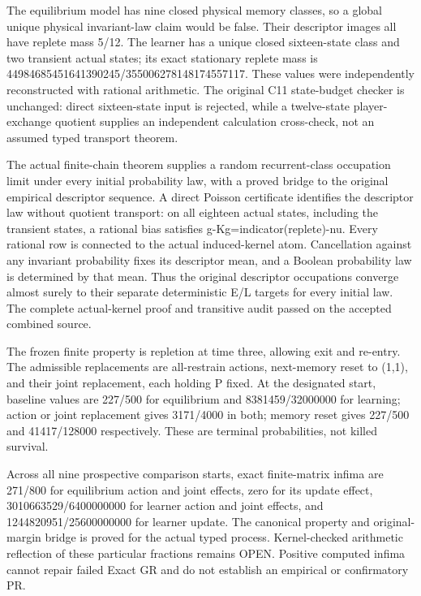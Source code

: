 \documentclass[11pt,a4paper]{article}
\begin{document}
The equilibrium model has nine closed physical memory classes, so a global unique physical invariant-law claim would be false. Their descriptor images all have replete mass 5/12. The learner has a unique closed sixteen-state class and two transient actual states; its exact stationary replete mass is 449846854516\allowbreak{}41390245/355\allowbreak{}006278148174\allowbreak{}557117. These values were independently reconstructed with rational arithmetic. The original C11 state-budget checker is unchanged: direct sixteen-state input is rejected, while a twelve-state player-exchange quotient supplies an independent calculation cross-check, not an assumed typed transport theorem.

The actual finite-chain theorem supplies a random recurrent-class occupation limit under every initial probability law, with a proved bridge to the original empirical descriptor sequence. A direct Poisson certificate identifies the descriptor law without quotient transport: on all eighteen actual states, including the transient states, a rational bias satisfies g-Kg=indicat\allowbreak{}or(replete)-\allowbreak{}nu. Every rational row is connected to the actual induced-kernel atom. Cancellation against any invariant probability fixes its descriptor mean, and a Boolean probability law is determined by that mean. Thus the original descriptor occupations converge almost surely to their separate deterministic E/L targets for every initial law. The complete actual-kernel proof and transitive audit passed on the accepted combined source.

The frozen finite property is repletion at time three, allowing exit and re-entry. The admissible replacements are all-restrain actions, next-memory reset to (1,1), and their joint replacement, each holding P fixed. At the designated start, baseline values are 227/500 for equilibrium and 8381459/32000000 for learning; action or joint replacement gives 3171/4000 in both; memory reset gives 227/500 and 41417/128000 respectively. These are terminal probabilities, not killed survival.

Across all nine prospective comparison starts, exact finite-matrix infima are 271/800 for equilibrium action and joint effects, zero for its update effect, 3010663529/6400000000 for learner action and joint effects, and 1244820951/25600000000 for learner update. The canonical property and original-margin bridge is proved for the actual typed process. Kernel-checked arithmetic reflection of these particular fractions remains OPEN. Positive computed infima cannot repair failed Exact GR and do not establish an empirical or confirmatory PR.
\end{document}
